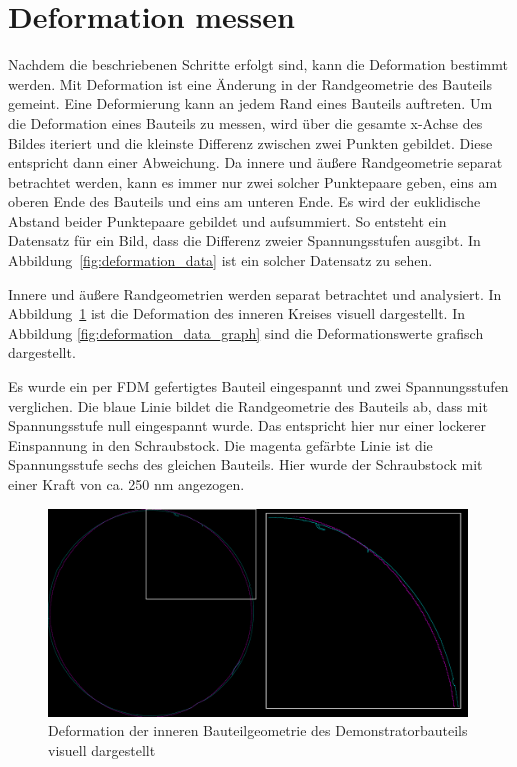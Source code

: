\section{Deformation messen}

Nachdem die beschriebenen Schritte erfolgt sind, kann die Deformation bestimmt werden.
Mit Deformation ist eine Änderung in der Randgeometrie des Bauteils gemeint.
Eine Deformierung kann an jedem Rand eines Bauteils auftreten.
Um die Deformation eines Bauteils zu messen, wird über die 
gesamte x-Achse des Bildes iteriert und die kleinste Differenz 
zwischen zwei Punkten gebildet. Diese entspricht dann einer Abweichung. 
Da innere und äußere Randgeometrie separat betrachtet werden, kann es immer nur zwei
solcher Punktepaare geben, eins am oberen Ende des Bauteils und eins am unteren Ende.
Es wird der euklidische Abstand beider Punktepaare gebildet und aufsummiert.
So entsteht ein Datensatz für ein Bild, 
dass die Differenz zweier Spannungsstufen ausgibt. In Abbildung~\ref{fig:deformation_data}
ist ein solcher Datensatz zu sehen. 

Innere und äußere Randgeometrien werden separat betrachtet und analysiert.
In Abbildung~\ref{fig:deformation_data_vis} ist die Deformation des inneren Kreises
visuell dargestellt. In Abbildung \ref{fig:deformation_data_graph} sind die 
Deformationswerte grafisch dargestellt.

Es wurde ein per FDM gefertigtes Bauteil eingespannt und zwei Spannungsstufen verglichen.
Die blaue Linie bildet die Randgeometrie des Bauteils ab, dass mit Spannungsstufe
null eingespannt wurde. Das entspricht hier nur einer lockerer Einspannung in den 
Schraubstock. Die magenta gefärbte Linie ist die Spannungsstufe sechs des gleichen
Bauteils. Hier wurde der Schraubstock mit einer Kraft von ca. 250 nm angezogen.

\begin{figure}[H]
    \centering
    \includegraphics[width=0.99\textwidth]{images/FDM2_SP0_stitched_FDM2_SP4_stitched_1_1_cut.png}
    \caption{Deformation der inneren Bauteilgeometrie des Demonstratorbauteils 
    visuell dargestellt}
    \label{fig:deformation_data_vis}
\end{figure}

